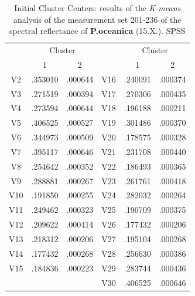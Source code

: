\documentclass[10pt, a4paper]{article}
\begin{document}
\begin{appendices}
\begin{table}[htbp]
\caption{Initial Cluster Centers: results of the \textit{K-means} analysis of the measurement set 201-236 of the spectral reflectance of \textbf{P.oceanica} (15.X.). SPSS}
\label{tab:13}
\begin{center}
\begin{tabular}{|c|c|c|c|c|c|}
\hline\hline
& \multicolumn{2}{|c|}{Cluster} &  & \multicolumn{2}{|c|}{Cluster}\\
 & 1 & 2 &  & 1 & 2 \\ \hline\hline
V2 &	.353010 &	.000644 &	V16 &	.240091 &	.000374 \\ \hline
V3 &	 .271519 &	.000394 &	V17 &	.270306 &	.000435 \\ \hline
V4 &	.273594 &	.000644 &	V18 &	.196188 &	.000211 \\ \hline
V5 &	.406525 &	.000527 &	V19 &	.301486 &	.000370 \\ \hline
V6 &	.344973 &	.000509 &	V20 &	.178575 &	.000328 \\ \hline
V7 &	.395117 &	.000646 &	V21 &	.231708 &	.000440 \\ \hline
V8 &	.254642 &	.000352 &	V22 &	.186493 &	.000365 \\ \hline
V9 &	.288881 &	.000267 &	V23 &	.261761 &	.000418 \\ \hline
V10 &	.191850 &	.000255 &	V24 &	.282032 &	.000264 \\ \hline
V11 &	.249462 &	.000323 &	V25 &	.190709 &	.000375 \\ \hline
V12 &	.209622 &	.000414 &	V26 &	.177432 &	.000206 \\ \hline
V13 &	.218312 &	.000206 &	V27 &	.195104 &	.000268 \\ \hline
V14 &	.177432 &	.000268 &	V28 &	.256630 &	.000386 \\ \hline
V15 &	.184836 &	.000223 &	V29 &	.283744 &	.000436 \\ \hline
	 &	 &	 &		V30 &	.406525 &	.000646 \\ \hline
\end{tabular}
\end{center}
\label{tab:14}
\end{table}


\end{appendices}
\end{document}
